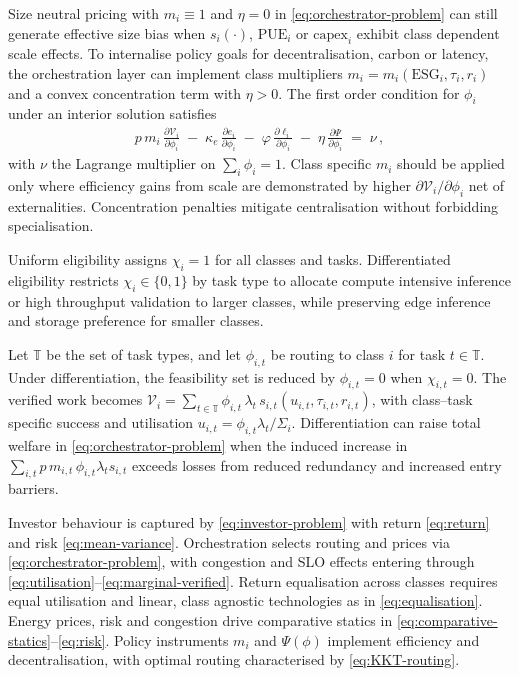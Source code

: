 \documentclass[oneside,10pt]{swissi}
\begin{document}
Size neutral pricing with \(m_i\equiv 1\) and \(\eta=0\) in \eqref{eq:orchestrator-problem} can still generate effective size bias when \(s_i(\cdot)\), \(\mathrm{PUE}_i\) or \(\mathrm{capex}_i\) exhibit class dependent scale effects. To internalise policy goals for decentralisation, carbon or latency, the orchestration layer can implement class multipliers \(m_i=m_i(\text{ESG}_i,\tau_i,r_i)\) and a convex concentration term with \(\eta>0\). The first order condition for \(\phi_i\) under an interior solution satisfies
\begin{align}
p\,m_i\,\frac{\partial \mathcal{V}_i}{\partial \phi_i} \;-\; \kappa_e\,\frac{\partial e_i}{\partial \phi_i} \;-\; \varphi\,\frac{\partial \ell_i}{\partial \phi_i} \;-\; \eta\,\frac{\partial \Psi}{\partial \phi_i} \;=\; \nu\,,
\label{eq:KKT-routing}
\end{align}
with \(\nu\) the Lagrange multiplier on \(\sum_i \phi_i=1\). Class specific \(m_i\) should be applied only where efficiency gains from scale are demonstrated by higher \(\partial \mathcal{V}_i/\partial \phi_i\) net of externalities. Concentration penalties mitigate centralisation without forbidding specialisation.

Uniform eligibility assigns \(\chi_i=1\) for all classes and tasks. Differentiated eligibility restricts \(\chi_i\in\{0,1\}\) by task type to allocate compute intensive inference or high throughput validation to larger classes, while preserving edge inference and storage preference for smaller classes.

Let \(\mathbb{T}\) be the set of task types, and let \(\phi_{i,t}\) be routing to class \(i\) for task \(t\in\mathbb{T}\). Under differentiation, the feasibility set is reduced by \(\phi_{i,t}=0\) when \(\chi_{i,t}=0\). The verified work becomes \(\mathcal{V}_i=\sum_{t\in\mathbb{T}}\phi_{i,t}\,\lambda_t\, s_{i,t}(u_{i,t},\tau_{i,t},r_{i,t})\), with class–task specific success and utilisation \(u_{i,t}=\phi_{i,t}\lambda_t/\Sigma_i\). Differentiation can raise total welfare in \eqref{eq:orchestrator-problem} when the induced increase in \(\sum_{i,t} p\,m_{i,t}\,\phi_{i,t}\lambda_t s_{i,t}\) exceeds losses from reduced redundancy and increased entry barriers.

Investor behaviour is captured by \eqref{eq:investor-problem} with return \eqref{eq:return} and risk \eqref{eq:mean-variance}. Orchestration selects routing and prices via \eqref{eq:orchestrator-problem}, with congestion and SLO effects entering through \eqref{eq:utilisation}–\eqref{eq:marginal-verified}. Return equalisation across classes requires equal utilisation and linear, class agnostic technologies as in \eqref{eq:equalisation}. Energy prices, risk and congestion drive comparative statics in \eqref{eq:comparative-statics}–\eqref{eq:risk}. Policy instruments \(m_i\) and \(\Psi(\phi)\) implement efficiency and decentralisation, with optimal routing characterised by \eqref{eq:KKT-routing}.
\end{document}
